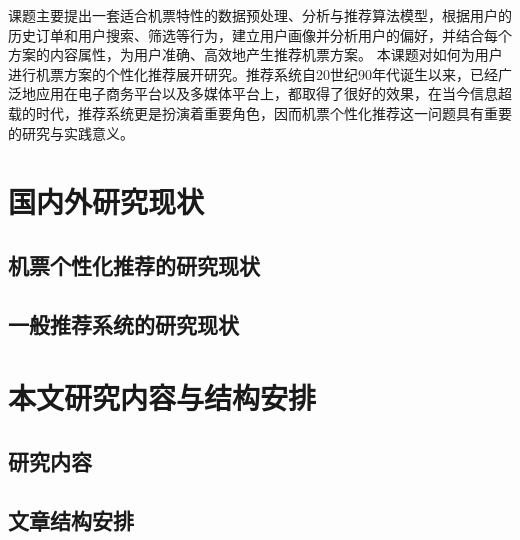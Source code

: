 课题主要提出一套适合机票特性的数据预处理、分析与推荐算法模型，根据用户的历史订单和用户搜索、筛选等行为，建立用户画像并分析用户的偏好，并结合每个方案的内容属性，为用户准确、高效地产生推荐机票方案。
本课题对如何为用户进行机票方案的个性化推荐展开研究。推荐系统自20世纪90年代诞生以来，已经广泛地应用在电子商务平台以及多媒体平台上，都取得了很好的效果，在当今信息超载的时代，推荐系统更是扮演着重要角色，因而机票个性化推荐这一问题具有重要的研究与实践意义。



\section{国内外研究现状}
\subsection{机票个性化推荐的研究现状}
\subsection{一般推荐系统的研究现状}


\section{本文研究内容与结构安排}
\subsection{研究内容}
\subsection{文章结构安排}